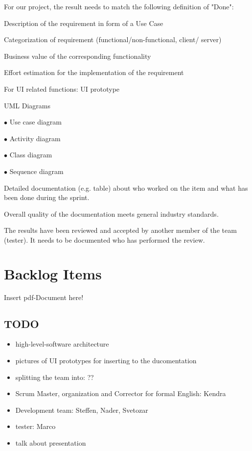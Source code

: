 \documentclass[a4paper, 12pt]{article}
\begin{document}
For our project, the result needs to match the following definition of "Done":
\begin{todolist}

\item Description of the requirement in form of a Use Case
\item Categorization of requirement (functional/non-functional, client/ server)
\item Business value of the corresponding functionality
\item Effort estimation for the implementation of the requirement
\item For UI related functions: UI prototype
\item UML Diagrams 

    $\bullet$ Use case diagram
    
    $\bullet$ Activity diagram
    
    $\bullet$ Class diagram
    
    $\bullet$ Sequence diagram
    
\item Detailed documentation (e.g. table) about who worked on the item and what has been done during the sprint.
\item Overall quality of the documentation meets general industry standards.
\item The results have been reviewed and accepted by another member of the team (tester). It needs to be documented who has performed the review.

\end{todolist}


\section{Backlog Items}

Insert pdf-Document here!

\subsection{TODO}
\begin{itemize}
\item high-level-software architecture
\item pictures of UI prototypes for inserting to the ducomentation
\item splitting the team into: ??
	\item Scrum Master, organization and Corrector for formal English: Kendra
	\item Development team: Steffen, Nader, Svetozar
	\item tester: Marco
\item talk about presentation
\end{itemize}
\end{document}

